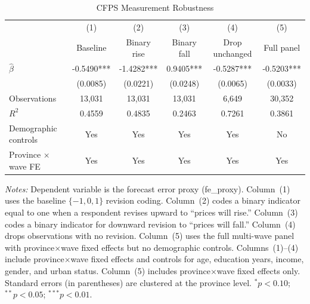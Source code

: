 \begin{table}[htbp]
\centering
\caption{CFPS Measurement Robustness}
\label{tab:cfps_robustness}
\small
\begin{tabular}{lccccc}
\toprule
 & (1) & (2) & (3) & (4) & (5) \\
 & Baseline & Binary rise & Binary fall & Drop unchanged & Full panel \\
\midrule
$\hat{\beta}$ & -0.5490*** & -1.4282*** & 0.9405*** & -0.5287*** & -0.5203*** \\
 & (0.0085) & (0.0221) & (0.0248) & (0.0065) & (0.0033) \\
\addlinespace
Observations & 13,031 & 13,031 & 13,031 & 6,649 & 30,352 \\
$R^2$ & 0.4559 & 0.4835 & 0.2463 & 0.7261 & 0.3861 \\
\addlinespace
Demographic controls & Yes & Yes & Yes & Yes & No \\
Province $\times$ wave FE & Yes & Yes & Yes & Yes & Yes \\
\bottomrule
\end{tabular}
\begin{tablenotes}
\small
\item \textit{Notes:} Dependent variable is the forecast error proxy (fe\_proxy). Column~(1) uses the baseline $\{-1,0,1\}$ revision coding. Column~(2) codes a binary indicator equal to one when a respondent revises upward to ``prices will rise.'' Column~(3) codes a binary indicator for downward revision to ``prices will fall.'' Column~(4) drops observations with no revision. Column~(5) uses the full multi-wave panel with province$\times$wave fixed effects but no demographic controls. Columns~(1)--(4) include province$\times$wave fixed effects and controls for age, education years, income, gender, and urban status. Column~(5) includes province$\times$wave fixed effects only. Standard errors (in parentheses) are clustered at the province level. $^{*}p<0.10$; $^{**}p<0.05$; $^{***}p<0.01$.
\end{tablenotes}
\end{table}